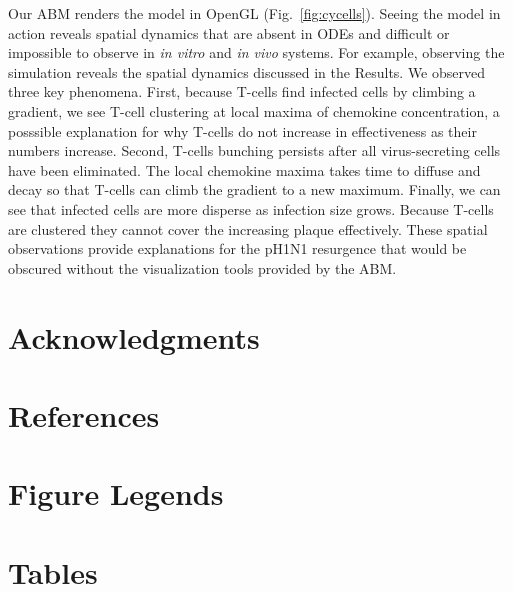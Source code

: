 \documentclass[10pt]{article}
\begin{document}
Our ABM renders the model in OpenGL (Fig.~\ref{fig:cycells}).  Seeing the model in action reveals spatial dynamics that are absent in ODEs and difficult or impossible to observe in \textit{in vitro} and \textit{in vivo} systems.  For example, observing the simulation reveals the spatial dynamics discussed in the Results.  We observed three key phenomena.  First, because T-cells find infected cells by climbing a gradient, we see T-cell clustering at local maxima of chemokine concentration, a posssible explanation for why T-cells do not increase in effectiveness as their numbers increase.  Second, T-cells bunching persists after all virus-secreting cells have been eliminated.  The local chemokine maxima takes time to diffuse and decay so that T-cells can climb the gradient to a new maximum.  Finally, we can see that infected cells are more disperse as infection size grows.  Because T-cells are clustered they cannot cover the increasing plaque effectively.  These spatial observations provide explanations for the pH1N1 resurgence that would be obscured without the visualization tools provided by the ABM.

\section*{Acknowledgments}


\section*{References}


\section*{Figure Legends}


\section*{Tables}
\end{document}
